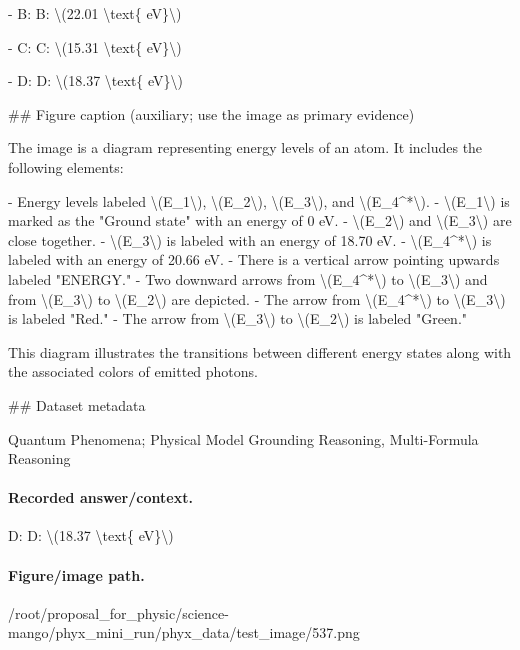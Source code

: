 - B: B: \textbackslash{}(22.01 \textbackslash{}text\{ eV\}\textbackslash{})

- C: C: \textbackslash{}(15.31 \textbackslash{}text\{ eV\}\textbackslash{})

- D: D: \textbackslash{}(18.37 \textbackslash{}text\{ eV\}\textbackslash{})

\#\# Figure caption (auxiliary; use the image as primary evidence)

The image is a diagram representing energy levels of an atom. It includes the following elements:

- Energy levels labeled \textbackslash{}(E\_1\textbackslash{}), \textbackslash{}(E\_2\textbackslash{}), \textbackslash{}(E\_3\textbackslash{}), and \textbackslash{}(E\_4\textasciicircum{}*\textbackslash{}).
- \textbackslash{}(E\_1\textbackslash{}) is marked as the "Ground state" with an energy of 0 eV.
- \textbackslash{}(E\_2\textbackslash{}) and \textbackslash{}(E\_3\textbackslash{}) are close together.
- \textbackslash{}(E\_3\textbackslash{}) is labeled with an energy of 18.70 eV.
- \textbackslash{}(E\_4\textasciicircum{}*\textbackslash{}) is labeled with an energy of 20.66 eV.
- There is a vertical arrow pointing upwards labeled "ENERGY."
- Two downward arrows from \textbackslash{}(E\_4\textasciicircum{}*\textbackslash{}) to \textbackslash{}(E\_3\textbackslash{}) and from \textbackslash{}(E\_3\textbackslash{}) to \textbackslash{}(E\_2\textbackslash{}) are depicted.
- The arrow from \textbackslash{}(E\_4\textasciicircum{}*\textbackslash{}) to \textbackslash{}(E\_3\textbackslash{}) is labeled "Red."
- The arrow from \textbackslash{}(E\_3\textbackslash{}) to \textbackslash{}(E\_2\textbackslash{}) is labeled "Green."

This diagram illustrates the transitions between different energy states along with the associated colors of emitted photons.

\#\# Dataset metadata

Quantum Phenomena; Physical Model Grounding Reasoning, Multi-Formula Reasoning

\paragraph{Recorded answer/context.}
D: D: \textbackslash{}(18.37 \textbackslash{}text\{ eV\}\textbackslash{})

\paragraph{Figure/image path.}
/root/proposal\_for\_physic/science-mango/phyx\_mini\_run/phyx\_data/test\_image/537.png

